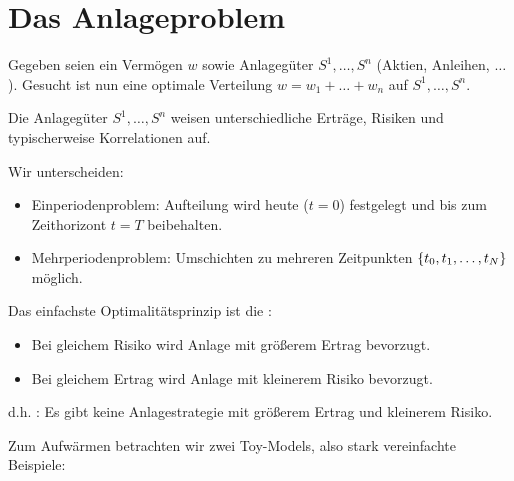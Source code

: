 \section{Das Anlageproblem}

Gegeben seien ein Vermögen $w$ sowie Anlagegüter $S^1, \dots, S^n$ (Aktien, Anleihen, $\dots$). Gesucht ist nun eine optimale Verteilung $w = w_1 + \dots + w_n$ auf $S^1, \dots, S^n$.

Die Anlagegüter $S^1, \dots, S^n$ weisen unterschiedliche Erträge, Risiken und typischerweise Korrelationen auf.

Wir unterscheiden:
\begin{itemize}[nolistsep, topsep=-\parskip]
	\item Einperiodenproblem: Aufteilung wird heute ($t=0$) festgelegt und bis zum Zeithorizont $t=T$ beibehalten.
	\item Mehrperiodenproblem: Umschichten zu mehreren Zeitpunkten $\left\{ t_0, t_1, \dots, t_N \right\}$ möglich.
\end{itemize} \vspace{\parskip}

Das einfachste Optimalitätsprinzip ist die :
\begin{itemize}[nolistsep,topsep=-\parskip]
	\item Bei gleichem Risiko wird Anlage mit größerem Ertrag bevorzugt.
	\item Bei gleichem Ertrag wird Anlage mit kleinerem Risiko bevorzugt.
\end{itemize}
d.h. : Es gibt keine Anlagestrategie mit größerem Ertrag und kleinerem Risiko.

Zum Aufwärmen betrachten wir zwei Toy-Models, also stark vereinfachte Beispiele:

